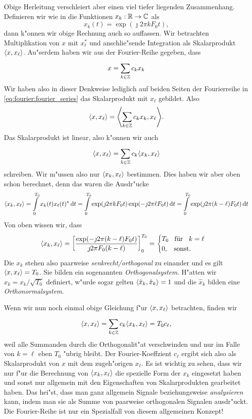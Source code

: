 Obige Herleitung verschleiert aber einen viel tiefer liegenden Zusammenhang.
Definieren wir wie in  die Funktionen $x_k : \mathbb{R} \rightarrow \mathbb{C}$ als
\[
x_k(t) = \exp(\jmath 2 \pi k F_0 t),
\]
dann k"onnen wir obige Rechnung auch so auffassen.
Wir betrachten Multiplikation von $x$ mit $x_\ell^\ast$ und anschlie"sende Integration als Skalarprodukt ${\left\langle x,x_\ell \right\rangle}$. 
Au"serdem haben wir aus der Fourier-Reihe gegeben, dass
\[
x = {\sum\limits_{k \in \mathbb{Z}}^{}{c_k x_k}}
\]
Wir haben also in dieser Denkweise lediglich auf beiden Seiten der Fourierreihe in \eqref{eq:fourier:fourier_series} das Skalarprodukt mit $x_\ell$ gebildet.
Also
\[
{\left\langle x,x_\ell \right\rangle} = {\left\langle {\sum\limits_{k \in \mathbb{Z}}^{}{c_k x_k}},x_\ell \right\rangle}.
\]
Das Skalarprodukt ist linear, also k"onnen wir auch
\[
{\left\langle x,x_\ell \right\rangle} = {\sum\limits_{k \in \mathbb{Z}}^{}{c_k {\left\langle x_k,x_\ell \right\rangle}}}
\]
schreiben.
Wir m"ussen also nur ${\left\langle x_k,x_\ell \right\rangle}$ bestimmen. 
Dies haben wir aber oben schon berechnet, denn das waren die Ausdr"ucke
\[
{\left\langle x_k,x_\ell \right\rangle}
    = {\int\limits_{0}^{T_0}{x_k(t) x_\ell(t)^\ast}\,\mathrm{d}{t}}
    = {\int\limits_{0}^{T_0}{\exp(\jmath 2 \pi k F_0 t) \exp(-\jmath 2 \pi \ell F_0 t)}\,\mathrm{d}{t}}
    = {\int\limits_{0}^{T_0}{\exp(\jmath 2 \pi (k - \ell) F_0 t)}\,\mathrm{d}{t}}
\]
Von oben wissen wir, dass
\[
{\left\langle x_k,x_\ell \right\rangle} 
    = \left[
        \frac{
            \exp(-\jmath 2 \pi (k - \ell) F_0 t)
        }{
            \jmath 2 \pi F_0(k - \ell)
        }
    \right]_{0}^{T_0}
    = \begin{cases}
        T_0 {\hspace{3mm} \text{f\"ur} \hspace{3mm}} k = \ell \\
        0, {\hspace{3mm} \text{sonst.} \hspace{3mm}}
    \end{cases}
\]
Die $x_k$ stehen also paarweise \emph{senkrecht/orthogonal} zu einander und es gilt ${\left\langle x,x_\ell \right\rangle} = T_0$.
Sie bilden ein sogenannten \emph{Orthogonalsystem}.
H"atten wir $\hat{x}_k = x_k / \sqrt{T_0}$ definiert, w"urde sogar gelten ${\left\langle \hat{x}_k,\hat{x}_k \right\rangle} = 1$ und die $\hat{x}_k$ bilden eine \emph{Orthonormalsystem}.

Wenn wir nun noch einmal obige Gleichung f"ur ${\left\langle x,x_\ell \right\rangle}$ betrachten, finden wir
\[
{\left\langle x,x_\ell \right\rangle} 
    = {\sum\limits_{k \in \mathbb{Z}}^{}{c_k {\left\langle x_k,x_\ell \right\rangle}}}
    = T_0 c_\ell,
\]
weil alle Summanden durch die Orthogonalit"at verschwinden und nur im Falle von $k = \ell$ eben $T_0$ "ubrig bleibt.
Der Fourier-Koeffzient $c_\ell$ ergibt sich also als Skalarprodukt von $x$ mit dem zugeh"origen $x_\ell$.
Es ist wichtig zu sehen, dass wir nur f"ur die Berechnung von ${\left\langle x_k,x_\ell \right\rangle}$ die spezielle Form der $x_k$ eingesetzt haben und sonst nur allgemein mit den Eigenschaften von Skalarprodukten gearbeitet haben.
Das hei"st, dass man ganz allgemein Signale  beziehungsweise \emph{analysieren} kann, indem man sie als Summe von paarweise orthogonalen Signalen ausdr"uckt.
Die Fourier-Reihe ist nur ein Spezialfall von diesem allgemeinen Konzept!


